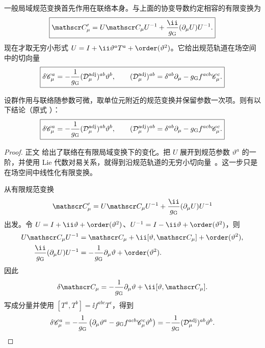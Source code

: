 一般局域规范变换首先作用在联络本身。与上面的协变导数约定相容的有限变换为
\begin{equation}
\boxed{
 \mathscr C_\mu'
 =U\mathscr C_\mu U^{-1}
 +\frac{\ii}{g_{\rm G}}(\partial_\mu U)U^{-1}.}
\label{eq:generic-finite-gauge-transform-dp68}
\end{equation}
现在才取无穷小形式 $U=I+\ii\vartheta^aT^a+\order(\vartheta^2)$。它给出规范轨道在场空间中的切向量
\begin{equation}
 \boxed{
 \delta\mathscr C_\mu^a
 =-\frac1{g_{\rm G}}(\mathcal D_\mu^{\rm adj})^{ab}\vartheta^b,
 \qquad
 (\mathcal D_\mu^{\rm adj})^{ab}
 =\delta^{ab}\partial_\mu-g_{\rm G}f^{acb}\mathscr C_\mu^c.}
 \label{eq:generic-infinitesimal-gauge-dp11}
\end{equation}

\begin{proposition}[有限规范变换的无穷小形式]
设群作用与联络随参数可微，取单位元附近的规范变换并保留参数一次项。则有以下结论（原式 ）：
\begin{equation*}
 \boxed{
 \delta\mathscr C_\mu^a
 =-\frac1{g_{\rm G}}(\mathcal D_\mu^{\rm adj})^{ab}\vartheta^b,
 \qquad
 (\mathcal D_\mu^{\rm adj})^{ab}
 =\delta^{ab}\partial_\mu-g_{\rm G}f^{acb}\mathscr C_\mu^c.}
\end{equation*}
\end{proposition}
\begin{proof}
正文 给出了联络在有限局域变换下的变化。把 $U$ 展开到规范参数 $\vartheta^a$ 的一阶，并使用 Lie 代数对易关系，就得到沿规范轨道的无穷小切向量~。这一步只是在场空间中线性化有限变换。

从有限规范变换
\begin{equation*}
 \mathscr C_\mu'
 =U\mathscr C_\mu U^{-1}
 +\frac{\ii}{g_{\rm G}}(\partial_\mu U)U^{-1}
\end{equation*}
出发。令 $U=I+\ii\vartheta+\order(\vartheta^2)$、$U^{-1}=I-\ii\vartheta+\order(\vartheta^2)$，则
\begin{align*}
 U\mathscr C_\mu U^{-1}
 &=\mathscr C_\mu+\ii[\vartheta,\mathscr C_\mu]+\order(\vartheta^2),\\
 \frac{\ii}{g_{\rm G}}(\partial_\mu U)U^{-1}
 &=-\frac1{g_{\rm G}}\partial_\mu\vartheta+\order(\vartheta^2).
\end{align*}
因此
\begin{equation*}
 \delta\mathscr C_\mu
 =-\frac1{g_{\rm G}}\partial_\mu\vartheta+\ii[\vartheta,\mathscr C_\mu].
\end{equation*}
写成分量并使用 $[T^a,T^b]=\ii f^{abc}T^c$，得到
\begin{equation*}
 \delta\mathscr C_\mu^a
 =-\frac1{g_{\rm G}}\left(\partial_\mu\vartheta^a-g_{\rm G}f^{acb}\mathscr C_\mu^c\vartheta^b\right)
 =-\frac1{g_{\rm G}}(\mathcal D_\mu^{\rm adj})^{ab}\vartheta^b.
\end{equation*}
\end{proof}

